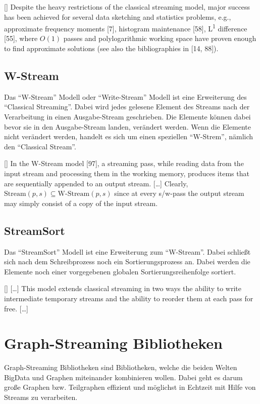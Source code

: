 [\cite{Ribichini2007}]{
Despite the heavy restrictions of the classical streaming model, major
success has been achieved for several data sketching and statistics problems,
e.g., approximate frequency moments [7], histogram maintenance [58],
L\textsuperscript{1} difference [55], where $O(1)$ passes and polylogarithmic
working space have proven enough to find approximate solutions (see also the
bibliographies in [14, 88]).
}

\subsection{W-Stream}
Das \enquote{W-Stream} Modell oder \enquote{Write-Stream} Modell ist eine
Erweiterung des \enquote{Classical Streaming}. Dabei wird jedes gelesene Element
des Streams nach der Verarbeitung in einen Ausgabe-Stream geschrieben. Die
Elemente können dabei bevor sie in den Ausgabe-Stream landen, verändert werden.
Wenn die Elemente nicht verändert werden, handelt es sich um einen speziellen
\enquote{W-Strem}, nämlich den \enquote{Classical Stream}.

[\cite{Ribichini2007}]{
In the W-Stream model [97], a streaming pass, while reading data from
the input stream and processing them in the working memory, produces items
that are sequentially appended to an output stream. [\dots]
Clearly, $\text{Stream}(p, s) \subseteq \text{W-Stream}(p, s)$ since at every
s/w-pass the output stream may simply consist of a copy of the input stream.
}

\subsection{StreamSort}
Das \enquote{StreamSort} Modell ist eine Erweiterung zum \enquote{W-Stream}.
Dabei schließt sich nach dem Schreibprozess noch ein Sortierungsprozess an. Dabei
werden die Elemente noch einer vorgegebenen globalen Sortierungsreihenfolge
sortiert.

[\cite{Ribichini2007}]{
[\dots] This model extends classical streaming in two ways the ability to write
intermediate temporary streams and the ability to reorder them at each pass for
free. [\dots]
}

\section{Graph-Streaming Bibliotheken}
Graph-Streaming Bibliotheken sind Bibliotheken, welche die beiden Welten
\gls{BigData} und Graphen miteinander kombinieren wollen. Dabei geht es darum
große Graphen bzw. Teilgraphen effizient und möglichst in Echtzeit mit Hilfe
von Streams zu verarbeiten.

